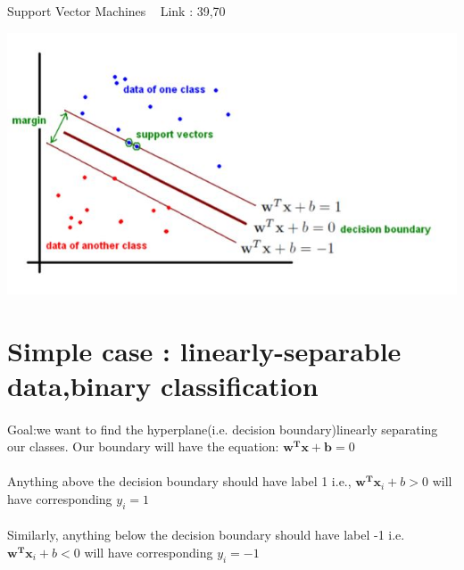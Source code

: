 \documentclass[a4paper]{article}
\begin{document}
\begin{algorithm}
 \caption{Support Vector Machines ~\cite{svm1
   } Link : 39,70}
    \begin{algorithmic}
 \begin{sloppypar}
 
  \includegraphics[width=\linewidth]{svm.jpg}
  
  \label{fig:svm1}


\end{sloppypar}
 
 \section{ Simple case : linearly-separable data,binary classification}
 
\paragraph{}
 Goal:we want to find the hyperplane(i.e. decision boundary)linearly
 separating our classes. Our boundary will have the equation: $\textbf{w}^ \textbf{T}\textbf{x}+ \textbf{b} = 0$
 
 \paragraph{}
 Anything above the decision boundary should have label 1 i.e., $\textbf{w}^\textbf{T}\textbf {x}_{i} + b  > 0 $ will have corresponding $y_{i} = 1$
 
\paragraph{}
Similarly, anything below the decision boundary should have label -1 i.e.
 $\textbf{w}^\textbf{T}\textbf {x}_{i} + b  < 0 $ will have corresponding $y_{i} = - 1$


\end{algorithmic}
\end{algorithm}
\end{document}
